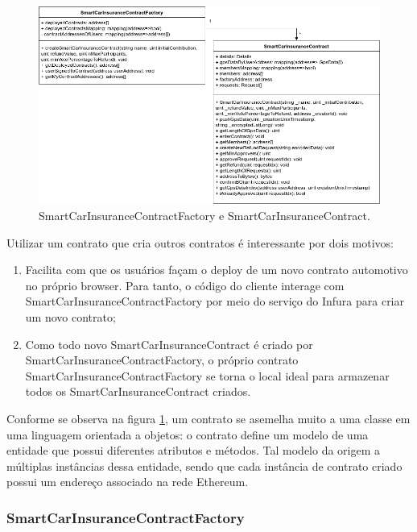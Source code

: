 \begin{figure}[h!]
\centering
\includegraphics[width=1\textwidth]{Cap2/SmartCarInsuranceContractFactory_and_SmartCarInsuranceContract.png}
\caption{SmartCarInsuranceContractFactory e SmartCarInsuranceContract.}
\label{factory_and_contracts}
\end{figure}

Utilizar um contrato que cria outros contratos é interessante por dois motivos:

\begin{enumerate}
\item Facilita com que os usuários façam o deploy de um novo contrato automotivo no próprio browser. Para tanto, o código do cliente interage com SmartCarInsuranceContractFactory por meio do serviço do Infura para criar um novo contrato;
\item Como todo novo SmartCarInsuranceContract é criado por SmartCarInsuranceContractFactory, o próprio contrato SmartCarInsuranceContractFactory se torna o local ideal para armazenar todos os SmartCarInsuranceContract criados.
\end{enumerate}

Conforme se observa na figura \ref{factory_and_contracts}, um contrato se asemelha muito a uma classe em uma linguagem orientada a objetos: o contrato define um modelo de uma entidade que possui diferentes atributos e métodos. Tal modelo da origem a múltiplas instâncias dessa entidade, sendo que cada instância de contrato criado possui um endereço associado na rede Ethereum.

\subsubsection{SmartCarInsuranceContractFactory}

